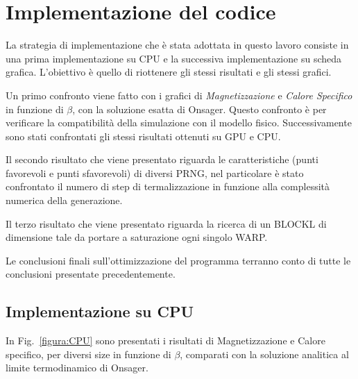 \documentclass[a4paper,12pt]{article}
\begin{document}
\section{Implementazione del codice}
La strategia di implementazione che \`e stata adottata in questo lavoro consiste in una prima implementazione su CPU e la successiva implementazione su scheda grafica. L'obiettivo \`e quello di riottenere gli stessi risultati e gli stessi grafici. 

Un primo confronto viene fatto con i grafici di \emph{Magnetizzazione} e \emph{Calore Specifico} in funzione di $\beta$, con la soluzione esatta di Onsager. Questo confronto \`e per verificare la compatibilit\`a della simulazione con il modello fisico. Successivamente sono stati confrontati gli stessi risultati ottenuti su GPU e CPU. 

Il secondo risultato che viene presentato riguarda le caratteristiche (punti favorevoli e punti sfavorevoli) di diversi PRNG, nel particolare \`e stato confrontato il numero di step di termalizzazione in funzione alla complessit\`a numerica della generazione. 

Il terzo risultato che viene presentato riguarda la ricerca di un BLOCKL di dimensione tale da portare a saturazione ogni singolo WARP.

Le conclusioni finali sull'ottimizzazione del programma terranno conto di tutte le conclusioni presentate precedentemente.

\subsection{Implementazione su CPU}
In Fig.~\ref{figura:CPU} sono presentati i risultati di Magnetizzazione e Calore specifico, per diversi size in funzione di $\beta$, comparati con la soluzione analitica al limite termodinamico di Onsager.
\end{document}
